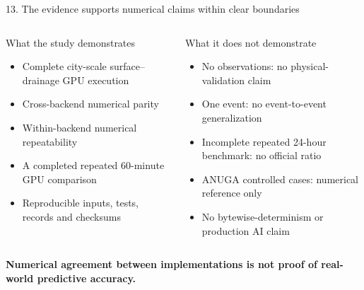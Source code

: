 \documentclass[aspectratio=169,10pt]{beamer}
\newcommand{\tightitem}{\setlength\itemsep{2pt}\setlength\parskip{0pt}}
\begin{document}
\begin{frame}{13. The evidence supports numerical claims within clear boundaries}
\begin{columns}[T,onlytextwidth]
\begin{block}{What the study demonstrates}
\small
\begin{itemize}\tightitem
\item Complete city-scale surface--drainage GPU execution
\item Cross-backend numerical parity
\item Within-backend numerical repeatability
\item A completed repeated 60-minute GPU comparison
\item Reproducible inputs, tests, records and checksums
\end{itemize}
\end{block}
\begin{alertblock}{What it does not demonstrate}
\small
\begin{itemize}\tightitem
\item No observations: no physical-validation claim
\item One event: no event-to-event generalization
\item Incomplete repeated 24-hour benchmark: no official ratio
\item ANUGA controlled cases: numerical reference only
\item No bytewise-determinism or production AI claim
\end{itemize}
\end{alertblock}
\end{columns}

\vspace{4mm}
\centering\color{hfblue}\bfseries Numerical agreement between implementations is not proof of real-world predictive accuracy.
\end{frame}
\end{document}
